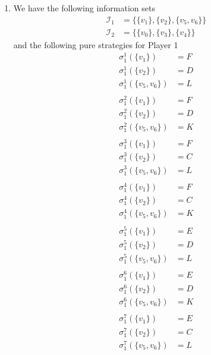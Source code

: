 \documentclass[a4paper]{article}
\begin{document}
\begin{exercise}{3}
\begin{enumerate}[label=(\alph*)]
\begin{enumerate}[label=(\roman*)]
        \item We have the following information sets
          \begin{align*}
            \mathcal{I}_1 &= \{\{v_1\}, \{v_2\}, \{v_5, v_6\}\} \\
            \mathcal{I}_2 &= \{\{v_0\}, \{v_3\}, \{v_4\}\}
          \end{align*}
          and the following pure strategies for Player 1
          \begin{align*}
            \sigma_1^{1}(\{v_1\}) &= F \\
            \sigma_1^{1}(\{v_2\}) &= D \\
            \sigma_1^{1}(\{v_5, v_6\}) &= L \\
            \\
            \sigma_1^{2}(\{v_1\}) &= F \\
            \sigma_1^{2}(\{v_2\}) &= D \\
            \sigma_1^{2}(\{v_5, v_6\}) &= K \\
            \\
            \sigma_1^{3}(\{v_1\}) &= F \\
            \sigma_1^{3}(\{v_2\}) &= C \\
            \sigma_1^{3}(\{v_5, v_6\}) &= L \\
            \\
            \sigma_1^{4}(\{v_1\}) &= F \\
            \sigma_1^{4}(\{v_2\}) &= C \\
            \sigma_1^{4}(\{v_5, v_6\}) &= K \\
            \\
            \sigma_1^{5}(\{v_1\}) &= E \\
            \sigma_1^{5}(\{v_2\}) &= D \\
            \sigma_1^{5}(\{v_5, v_6\}) &= L \\
            \\
            \sigma_1^{6}(\{v_1\}) &= E \\
            \sigma_1^{6}(\{v_2\}) &= D \\
            \sigma_1^{6}(\{v_5, v_6\}) &= K \\
            \\
            \sigma_1^{7}(\{v_1\}) &= E \\
            \sigma_1^{7}(\{v_2\}) &= C \\
            \sigma_1^{7}(\{v_5, v_6\}) &= L \\
            \\

\end{align*}
\end{enumerate}
\end{enumerate}
\end{exercise}
\end{document}
